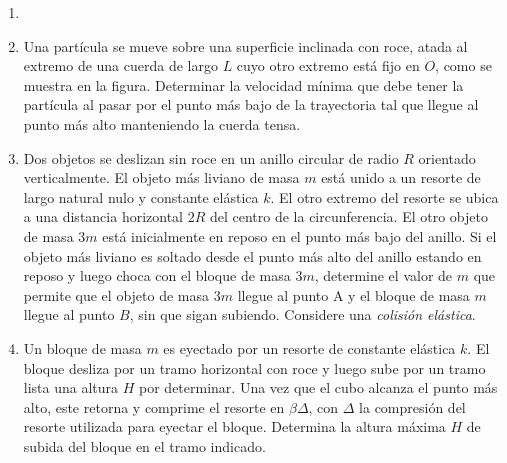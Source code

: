 \documentclass[letterpaper,11pt]{article}
\begin{document}
\vspace{-1cm}
\begin{enumerate}\setlength{\itemsep}{0.4cm}


\item[]

\item 
\begin{multicols}{2}
    Una partícula se mueve sobre una superficie inclinada con roce, atada al extremo de una cuerda de largo $L$ cuyo otro extremo está fijo en $O$, como se muestra en la figura. Determinar la velocidad mínima que debe tener la partícula al pasar por el punto más bajo de la trayectoria tal que llegue al punto más alto manteniendo la cuerda tensa.
    
    \columnbreak
    
    \begin{figure}[H]
        \centering
        
    \end{figure}
\end{multicols}

\item
\begin{multicols}{2}
    Dos objetos se deslizan sin roce en un anillo circular de radio $R$ orientado verticalmente. El objeto más liviano de masa $m$ está unido a un resorte de largo natural nulo y constante elástica $k$. El otro extremo del resorte se ubica a una distancia horizontal $2R$ del centro de la circunferencia. El otro objeto de masa $3m$ está inicialmente en reposo en el punto más bajo del anillo. Si el objeto más liviano es soltado desde el punto más alto del anillo estando en reposo y luego choca con el bloque de masa $3m$, determine el valor de $m$ que permite que el objeto de masa $3m$ llegue al punto A y el bloque de masa $m$ llegue al punto $B$, sin que sigan subiendo. Considere una \textit{colisión elástica}.
    \columnbreak
    \begin{figure}[H]
        \centering
        
    \end{figure}
\end{multicols}    
    


\item Un bloque de masa $m$ es eyectado por un resorte de constante elástica $k$. El bloque desliza por un tramo horizontal con roce y luego sube por un tramo lista una altura $H$ por determinar. Una vez que el cubo alcanza el punto más alto, este retorna y comprime el resorte en $\beta\Delta$, con $\Delta$ la compresión del resorte utilizada para eyectar el bloque. Determina la altura máxima $H$ de subida del bloque en el tramo indicado.


\end{enumerate}
\end{document}
